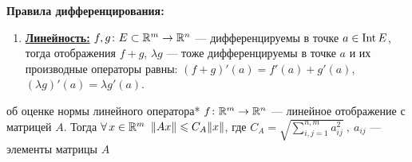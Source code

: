 \vspace{10pt}
\textbf{Правила дифференцирования:}
\begin{enumerate} %
	\item \href{https://www.youtube.com/live/9KZRjeVTXNY?si=Hcxa5JDA7wVkfMRg&t=7995}{\textbf{Линейность:}}
	$f, g\colon E\subset\mathbb R^m \to \mathbb R^n$ --- дифференцируемы в точке $a \in \mathrm{Int}\, E$,
	тогда отображения $f + g$, $\lambda g$ --- тоже дифференцируемы в точке $a$ 
	и их производные операторы равны: 
	$(f + g)'(a) = f'(a) + g'(a)$, 
	$(\lambda g)'(a) = \lambda g'(a)$.
\end{enumerate}

\begin{lem}[https://www.youtube.com/live/9KZRjeVTXNY?si=-WLmW4M02oNemOzS&t=8181]{об оценке нормы линейного оператора}*\label{оц.нормы}
	$f\colon \mathbb R^m \to \mathbb R^n$ --- линейное отображение с матрицей $A$. Тогда $\forall \, x \in \mathbb R^m$ $\|Ax\|\leqslant C_A \|x\|$, где $C_A = \sqrt{\sum\limits_{i, j = 1}^{n, m}a_{ij}^2}\ ,\ a_{ij}$ --- элементы матрицы $A$
\end{lem} %


